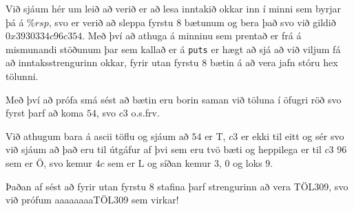 \documentclass{article}
\begin{document}
	Við sjáum hér um leið að verið er að lesa inntakið okkar inn í minni 
	sem byrjar þá á $\%rsp$, svo er verið að sleppa fyrstu $8$ bætunum og 
	bera það svo við gildið $0x3930334c96c354$. Með því að athuga á minninu 
	sem prentað er frá á mismunandi stöðunum þar sem kallað er á \texttt{puts} 
	er hægt að sjá að við viljum fá að inntaksstrengurinn okkar, fyrir utan 
	fyrstu $8$ bætin á að vera jafn stóru hex tölunni.

	Með því að prófa smá sést að bætin eru borin saman við töluna í öfugri 
	röð svo fyrst þarf að koma $54$, svo $c3$ o.s.frv.

	Við athugum bara á ascii töflu og sjáum að $54$ er T, $c3$ er ekki til 
	eitt og sér svo við sjáum að það eru til útgáfur af þvi sem eru tvö bæti 
	og heppilega er til $c3$ $96$ sem er Ö, svo kemur $4c$ sem er L og 
	síðan kemur $3$, $0$ og loks $9$. 

	Þaðan af sést að fyrir utan fyrstu $8$ stafina þarf strengurinn að vera 
	TÖL309, svo við prófum aaaaaaaaTÖL309 sem virkar!
	
\end{document}
